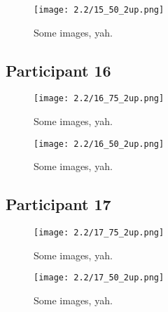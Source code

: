 \clearpage

\begin{figure}[h]
	\begin{center}
	\texttt{[image: 2.2/15\_50\_2up.png]}
	\caption{Some images, yah.}
	\end{center}
\end{figure}


\clearpage

\subsection{Participant 16}

\begin{figure}[h]
	\begin{center}
	\texttt{[image: 2.2/16\_75\_2up.png]}
	\caption{Some images, yah.}
	\end{center}
\end{figure}

\clearpage

\begin{figure}[h]
	\begin{center}
	\texttt{[image: 2.2/16\_50\_2up.png]}
	\caption{Some images, yah.}
	\end{center}
\end{figure}


\clearpage

\subsection{Participant 17}

\begin{figure}[h]
	\begin{center}
	\texttt{[image: 2.2/17\_75\_2up.png]}
	\caption{Some images, yah.}
	\end{center}
\end{figure}

\clearpage

\begin{figure}[h]
	\begin{center}
	\texttt{[image: 2.2/17\_50\_2up.png]}
	\caption{Some images, yah.}
	\end{center}
\end{figure}

